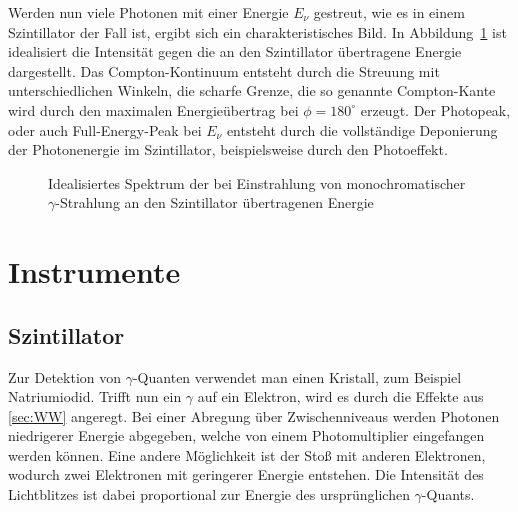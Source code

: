 Werden nun viele Photonen mit einer Energie $E_\nu$ gestreut, wie es in einem
Szintillator der Fall ist, ergibt sich ein charakteristisches Bild.
In Abbildung~\ref{fig:Compton} ist idealisiert die Intensität gegen
die an den Szintillator übertragene Energie dargestellt. Das
Compton-Kontinuum entsteht durch die Streuung mit unterschiedlichen Winkeln,
die scharfe Grenze, die so genannte Compton-Kante wird durch den maximalen
Energieübertrag bei $\phi = 180^\circ$ erzeugt. Der Photopeak, oder auch
Full-Energy-Peak bei $E_\nu$ entsteht durch die vollständige Deponierung der
Photonenergie im Szintillator, beispielsweise durch den Photoeffekt.

\begin{figure}[htbp]
    \centering
    \caption{%
        Idealisiertes Spektrum der bei Einstrahlung von monochromatischer
        $\gamma$-Strahlung an den Szintillator übertragenen Energie
    }
    \label{fig:Compton}
\end{figure}


\section{Instrumente}

\subsection{Szintillator}

Zur Detektion von $\gamma$-Quanten verwendet man einen Kristall, zum Beispiel
Natriumiodid. Trifft nun ein $\gamma$ auf ein Elektron, wird es durch die
Effekte aus \ref{sec:WW} angeregt. Bei einer Abregung über Zwischenniveaus
werden Photonen niedrigerer Energie abgegeben, welche von einem
Photomultiplier eingefangen werden können. Eine andere Möglichkeit ist der
Stoß mit anderen Elektronen, wodurch zwei Elektronen mit geringerer Energie
entstehen. Die Intensität des Lichtblitzes ist dabei proportional zur Energie
des ursprünglichen $\gamma$-Quants.

